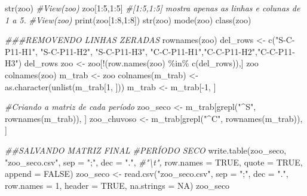 \documentclass[
  letterpaper,
  DIV=11,
  numbers=noendperiod]{scrartcl}
\newenvironment{Shaded}{}{}
\newcommand{\AttributeTok}[1]{\textcolor[rgb]{0.49,0.56,0.16}{#1}}
\newcommand{\CommentTok}[1]{\textcolor[rgb]{0.38,0.63,0.69}{\textit{#1}}}
\newcommand{\ConstantTok}[1]{\textcolor[rgb]{0.53,0.00,0.00}{#1}}
\newcommand{\DecValTok}[1]{\textcolor[rgb]{0.25,0.63,0.44}{#1}}
\newcommand{\DocumentationTok}[1]{\textcolor[rgb]{0.73,0.13,0.13}{\textit{#1}}}
\newcommand{\FunctionTok}[1]{\textcolor[rgb]{0.02,0.16,0.49}{#1}}
\newcommand{\NormalTok}[1]{#1}
\newcommand{\OtherTok}[1]{\textcolor[rgb]{0.00,0.44,0.13}{#1}}
\newcommand{\SpecialCharTok}[1]{\textcolor[rgb]{0.25,0.44,0.63}{#1}}
\newcommand{\StringTok}[1]{\textcolor[rgb]{0.25,0.44,0.63}{#1}}
\begin{document}
\begin{Shaded}
\begin{Highlighting}[numbers=left,,]
\FunctionTok{str}\NormalTok{(zoo)}
\CommentTok{\#View(zoo)}
\NormalTok{zoo[}\DecValTok{1}\SpecialCharTok{:}\DecValTok{5}\NormalTok{,}\DecValTok{1}\SpecialCharTok{:}\DecValTok{5}\NormalTok{] }\CommentTok{\#[1:5,1:5] mostra apenas as linhas e colunas de 1 a 5.}
\CommentTok{\#View(zoo)}
\FunctionTok{print}\NormalTok{(zoo[}\DecValTok{1}\SpecialCharTok{:}\DecValTok{8}\NormalTok{,}\DecValTok{1}\SpecialCharTok{:}\DecValTok{8}\NormalTok{])}
\FunctionTok{str}\NormalTok{(zoo)}
\FunctionTok{mode}\NormalTok{(zoo)}
\FunctionTok{class}\NormalTok{(zoo)}

\DocumentationTok{\#\#\#REMOVENDO LINHAS ZERADAS}
\FunctionTok{rownames}\NormalTok{(zoo)}
\NormalTok{del\_rows }\OtherTok{\textless{}{-}} \FunctionTok{c}\NormalTok{(}\StringTok{"S{-}C{-}P11{-}H1"}\NormalTok{, }\StringTok{"S{-}C{-}P11{-}H2"}\NormalTok{, }\StringTok{"S{-}C{-}P11{-}H3"}\NormalTok{, }\StringTok{"C{-}C{-}P11{-}H1"}\NormalTok{,}\StringTok{"C{-}C{-}P11{-}H2"}\NormalTok{,}\StringTok{"C{-}C{-}P11{-}H3"}\NormalTok{)}
\NormalTok{del\_rows}
\NormalTok{zoo }\OtherTok{\textless{}{-}}\NormalTok{ zoo[}\SpecialCharTok{!}\NormalTok{(}\FunctionTok{row.names}\NormalTok{(zoo) }\SpecialCharTok{\%in\%} \FunctionTok{c}\NormalTok{(del\_rows)),]}
\NormalTok{zoo}
\FunctionTok{colnames}\NormalTok{(zoo)}
\NormalTok{m\_trab }\OtherTok{\textless{}{-}}\NormalTok{ zoo}
\FunctionTok{colnames}\NormalTok{(m\_trab) }\OtherTok{\textless{}{-}} \FunctionTok{as.character}\NormalTok{(}\FunctionTok{unlist}\NormalTok{(m\_trab[}\DecValTok{1}\NormalTok{, ]))}
\NormalTok{m\_trab }\OtherTok{\textless{}{-}}\NormalTok{ m\_trab[}\SpecialCharTok{{-}}\DecValTok{1}\NormalTok{, ]}

\CommentTok{\#Criando a matriz de cada período}
\NormalTok{zoo\_seco }\OtherTok{\textless{}{-}}\NormalTok{ m\_trab[}\FunctionTok{grepl}\NormalTok{(}\StringTok{"\^{}S"}\NormalTok{, }\FunctionTok{rownames}\NormalTok{(m\_trab)), ]}
\NormalTok{zoo\_chuvoso }\OtherTok{\textless{}{-}}\NormalTok{ m\_trab[}\FunctionTok{grepl}\NormalTok{(}\StringTok{"\^{}C"}\NormalTok{, }\FunctionTok{rownames}\NormalTok{(m\_trab)), ]}

\DocumentationTok{\#\#SALVANDO MATRIZ FINAL}
\CommentTok{\#PERÍODO SECO}
\FunctionTok{write.table}\NormalTok{(zoo\_seco, }\StringTok{"zoo\_seco.csv"}\NormalTok{,}
            \AttributeTok{sep =} \StringTok{";"}\NormalTok{, }\AttributeTok{dec =} \StringTok{"."}\NormalTok{, }\CommentTok{\#"\textbackslash{}t",}
            \AttributeTok{row.names =} \ConstantTok{TRUE}\NormalTok{,}
            \AttributeTok{quote =} \ConstantTok{TRUE}\NormalTok{,}
            \AttributeTok{append =} \ConstantTok{FALSE}\NormalTok{)}
\NormalTok{zoo\_seco }\OtherTok{\textless{}{-}} \FunctionTok{read.csv}\NormalTok{(}\StringTok{"zoo\_seco.csv"}\NormalTok{,}
                   \AttributeTok{sep =} \StringTok{";"}\NormalTok{, }\AttributeTok{dec =} \StringTok{"."}\NormalTok{,}
                   \AttributeTok{row.names =} \DecValTok{1}\NormalTok{,}
                   \AttributeTok{header =} \ConstantTok{TRUE}\NormalTok{,}
                   \AttributeTok{na.strings =} \ConstantTok{NA}\NormalTok{)}
\NormalTok{zoo\_seco}


\end{Highlighting}
\end{Shaded}
\end{document}
